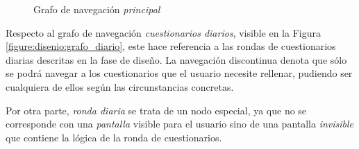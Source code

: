 \begin{figure}[h]
                \caption{Grafo de navegación \textit{principal}}
                \label{figure:disenio:grafo_principal}
            \end{figure}

            Respecto al grafo de navegación \textit{cuestionarios diarios}, visible en la Figura \ref{figure:disenio:grafo_diario}, este hace referencia a las rondas de cuestionarios diarias descritas en la fase de diseño. La navegación discontinua denota que sólo se podrá navegar a los cuestionarios que el usuario necesite rellenar, pudiendo ser cualquiera de ellos según las circunstancias concretas.

            Por otra parte, \textit{ronda diaria} se trata de un nodo especial, ya que no se corresponde con una \textit{pantalla} visible para el usuario sino de una pantalla \textit{invisible} que contiene la lógica de la ronda de cuestionarios. 
            
